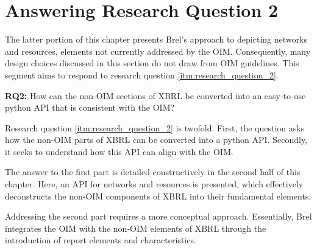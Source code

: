 \section{Answering Research Question 2}
\label{sec:answer_research_question_2}

The latter portion of this chapter presents Brel's approach to depicting networks and resources,
elements not currently addressed by the OIM.
Consequently, many design choices discussed in this section do not draw from OIM guidelines.
This segment aims to respond to research question \ref{itm:research_question_2}.

\begin{displayquote}
    \textbf{RQ2:} How can the non-OIM sections of XBRL be converted into an easy-to-use python API that is consistent with the OIM?
\end{displayquote}

Research question \ref{itm:research_question_2} is twofold.
First, the question asks how the non-OIM parts of XBRL can be converted into a python API.
Secondly, it seeks to understand how this API can align with the OIM.

The answer to the first part is detailed constructively in the second half of this chapter. 
Here, an API for networks and resources is presented, which effectively deconstructs the non-OIM components of XBRL into their fundamental elements.

Addressing the second part requires a more conceptual approach. 
Essentially, Brel integrates the OIM with the non-OIM elements of XBRL through the introduction of report elements and characteristics.


